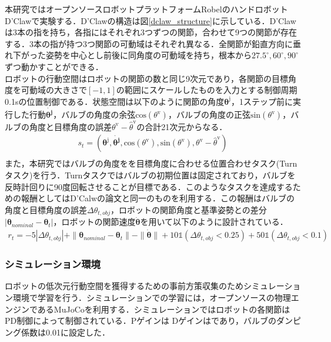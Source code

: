 \documentclass[dvipdfmx]{ampbt_nomag}
\begin{document}
 
本研究ではオープンソースロボットプラットフォームRobelのハンドロボットD'Clawで実験する\cite{ahn2020robel}．D'Clawの構造は図\ref{dclaw_structure}に示している．D'Clawは3本の指を持ち，各指にはそれぞれ3つずつの関節，合わせて9つの関節が存在する．3本の指が持つ3つ関節の可動域はそれぞれ異なる．全関節が鉛直方向に垂れ下がった姿勢を中心とし前後に同角度の可動域を持ち，根本から$27.5^\circ,60^\circ,90^\circ$ずつ動かすことができる．\\
ロボットの行動空間はロボットの関節の数と同じ9次元であり，各関節の目標角度を可動域の大きさで$[-1,1]$の範囲にスケールしたものを入力とする制御周期0.1sの位置制御である．状態空間は以下のように関節の角度$\boldsymbol{\theta}^{\textrm{j}}$，1ステップ前に実行した行動$\dot{\boldsymbol{\theta^{\textrm{j}}}}$，バルブの角度の余弦$\textrm{cos}(\theta^{\textrm{v}})$，バルブの角度の正弦$\textrm{sin}(\theta^{\textrm{v}})$，バルブの角度と目標角度の誤差$\theta^{\textrm{v}} - \hat{\theta}^{\textrm{v}}$の合計21次元からなる．\\
\begin{eqnarray}\label{state}
  s_t = \left(\boldsymbol{\theta}^{\textrm{j}},\dot{\boldsymbol{\theta^{\textrm{j}}}},\textrm{cos}(\theta^{\textrm{v}}),\textrm{sin}(\theta^{\textrm{v}}),\theta^{\textrm{v}} - \hat{\theta}^{\textrm{v}}\right) \nonumber \\ 
\end{eqnarray}
また，本研究ではバルブの角度をを目標角度に合わせる位置合わせタスク(Turnタスク)を行う．Turnタスクではバルブの初期位置は固定されており，バルブを反時計回りに90度回転させることが目標である．このようなタスクを達成するための報酬としてはD'Calwの論文と同一のものを利用する．この報酬はバルブの角度と目標角度の誤差$\Delta\theta_{t,obj}$，ロボットの関節角度と基準姿勢との差分$|\boldsymbol{\theta}_{nominal}-\boldsymbol{\theta}_t|$，ロボットの関節速度$\dot{\boldsymbol{\theta}}$を用いて以下のように設計されている．\\
\begin{eqnarray}\label{reward}
  r_t = −5|\Delta\theta_{t,obj}| + \|\boldsymbol{\theta}_{nominal}-\boldsymbol{\theta}_t\| -\|\dot{\boldsymbol{\theta}}\| + 10\mathds{1}(\Delta\theta_{t,obj} < 0.25) + 50\mathds{1}(\Delta\theta_{t,obj} < 0.1)
\end{eqnarray}

\subsubsection{シミュレーション環境}
ロボットの低次元行動空間を獲得するための事前方策収集のためシミュレーション環境で学習を行う．シミュレーションでの学習には，オープンソースの物理エンジンであるMuJoCoを利用する\cite{Mujoco}．シミュレーションではロボットの各関節はPD制御によって制御されている．Pゲインは Dゲインはであり，バルブのダンピング係数は0.01に設定した．
\end{document}
